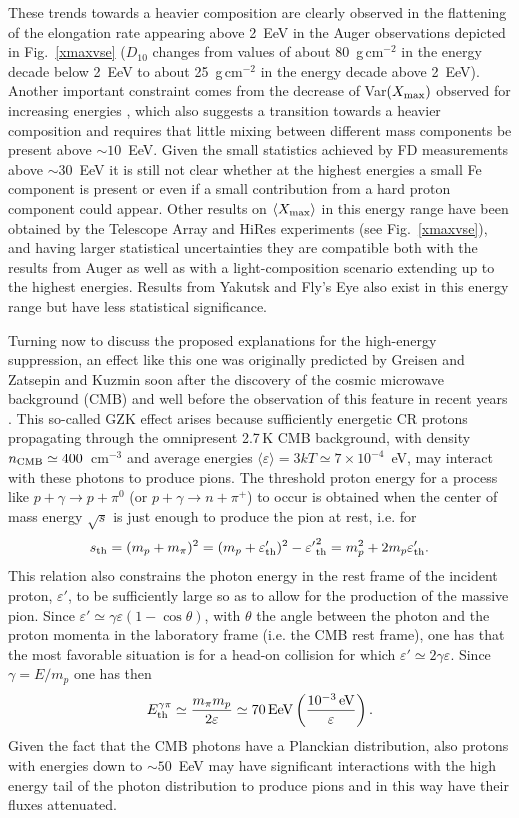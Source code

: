 \documentclass[twoside,12pt]{article}
\newcommand{\be}{\begin{equation}}
\newcommand{\ee}{\end{equation}}
\begin{document}
These trends towards a heavier composition are clearly observed in the flattening of the elongation rate appearing above 2~EeV in the Auger observations depicted in Fig.~\ref{xmaxvse} ($D_{10}$ changes from values of about 80~g\,cm$^{-2}$ in the energy decade below 2~EeV to about 25~g\,cm$^{-2}$ in the energy decade above 2~EeV). Another important constraint comes from the decrease of Var$(X_{\rm max})$ observed for increasing energies \cite{augerxmax}, which also suggests a transition towards a heavier composition and requires that little mixing between different mass components be present above $\sim 10$~EeV.  Given the  small statistics achieved by FD measurements above $\sim 30$~EeV it is still not clear whether at the highest energies a small Fe component is present or even if a small contribution from a hard proton component could appear. Other results on $\langle X_{\rm max}\rangle$ in this energy range have been obtained by the Telescope Array and HiRes experiments (see Fig.~\ref{xmaxvse}), and having larger statistical uncertainties they are compatible both with the results from Auger as well as with a light-composition scenario extending up to the highest energies. Results from Yakutsk and Fly's Eye also exist in this energy range but  have less statistical significance.


Turning now to discuss the proposed explanations for the high-energy suppression, an effect like this one was originally predicted by Greisen \cite{gr66} and Zatsepin and Kuzmin \cite{za66} soon after the discovery of the cosmic microwave background  (CMB) and well before the observation of this feature in recent years \cite{hiresgzk,augergzk}.  This so-called GZK effect arises because sufficiently energetic CR protons propagating through the omnipresent 2.7\,K CMB background, with density $n_{\rm CMB}\simeq 400$~cm$^{-3}$ and average energies $\langle\varepsilon\rangle=3kT\simeq 7\times 10^{-4}$~eV, may interact with these photons to produce pions. The threshold proton energy for a process like $p+\gamma\to p+\pi^0$ (or $p+\gamma\to n+\pi^{+}$) to occur is obtained when the center of mass energy $\sqrt{s}$ is just enough to produce the pion at rest, i.e. for
\be
s_{\rm th}=(m_p+m_\pi)^2=(m_p+\varepsilon'_{\rm th})^2-{\varepsilon'}_{\rm th}^2=m_p^2+2m_p\varepsilon'_{\rm th}.
\ee
This relation also constrains the photon energy in the rest frame of the incident proton, $\varepsilon'$, to be sufficiently large so as to allow for the 
production of the massive pion. Since $\varepsilon'\simeq \gamma\varepsilon(1-\cos\theta)$, with $\theta$ the angle between the photon and the proton momenta in the laboratory frame (i.e. the CMB rest frame), one has that the most favorable situation is for a head-on collision for which $\varepsilon'\simeq 2\gamma\varepsilon$. Since $\gamma=E/m_p$ one has then
\be 
E^{\gamma\pi}_{\rm th}\simeq \frac{m_\pi m_p}{2\varepsilon}\simeq 70\,{\rm EeV}\left(\frac{10^{-3}\,{\rm eV}}{\varepsilon}\right).
\ee
Given the fact that the CMB photons have a Planckian distribution, also protons with energies down to $\sim 50$~EeV may have significant interactions with the high energy tail of the photon distribution to produce pions and in this way have their fluxes attenuated. 
\end{document}
